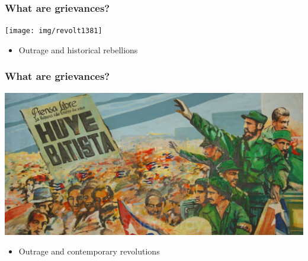 \documentclass[aspectratio=43]{beamer}
\begin{document}
\begin{frame}
\frametitle{What are grievances?}
\centering

\texttt{[image: img/revolt1381]}

\begin{itemize}
  \item Outrage and historical rebellions
\end{itemize}

\end{frame}

\begin{frame}
\frametitle{What are grievances?}
\centering

\includegraphics[width = \textwidth]{img/cuba}

\begin{itemize}
  \item Outrage and contemporary revolutions
\end{itemize}

\end{frame}
\end{document}
